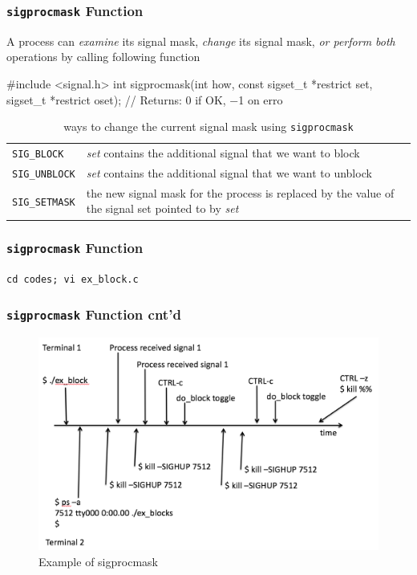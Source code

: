 \documentclass[newPxFont,sthlmFooter,nooffset]{beamer}
\begin{document}
\begin{frame}[fragile,t]
  \frametitle{\texttt{sigprocmask} Function}
A process can \textit{examine} its signal mask, \textit{change} its signal mask, \textit{or perform both} operations by calling following function

\begin{codedef}
#include <signal.h>
int sigprocmask(int how, const sigset_t *restrict set,
                sigset_t *restrict oset);
// Returns: 0 if OK, −1 on erro
\end{codedef}

\begin{table}[h]
  \centering
  \begin{tabular}{l | p{8cm}}
    \texttt{SIG\_BLOCK} & \textit{set} contains the additional signal that we want to block \\
    \texttt{SIG\_UNBLOCK} & \textit{set} contains the additional signal that we want to unblock \\
    \texttt{SIG\_SETMASK} & the new signal mask for the process is replaced by the value of the signal set pointed to by \textit{set}
  \end{tabular}
  \caption{ways to change the current signal mask using \texttt{sigprocmask}}
  \label{tab:sigprocmask}
\end{table}

\end{frame}



\begin{frame}
  \frametitle{\texttt{sigprocmask} Function}
\texttt{cd codes; vi ex\_block.c}


\end{frame}

\begin{frame}[fragile,t]
  \frametitle{\texttt{sigprocmask} Function cnt'd}
  \begin{figure}[h]
    \centering
    \includegraphics[width=\linewidth]{figure/fig_proc.png}
    \caption{Example of sigprocmask}
  \end{figure}

\end{frame}
\end{document}
